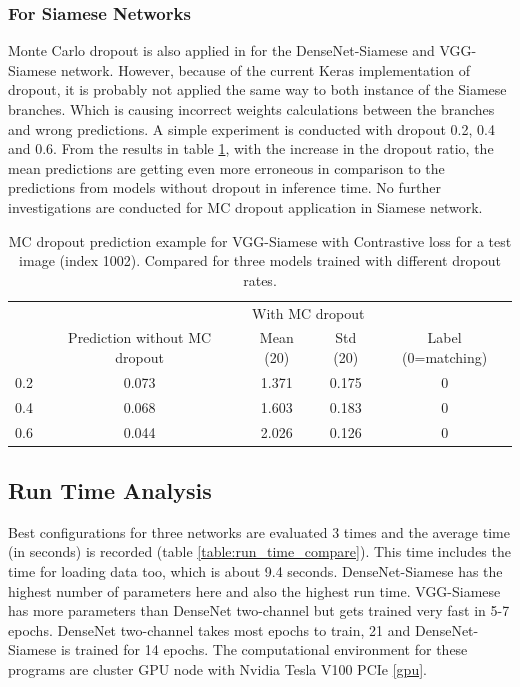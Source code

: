 \subsubsection{For Siamese Networks}
Monte Carlo dropout is also applied in for the DenseNet-Siamese and VGG-Siamese network. However, because of the current Keras implementation of dropout, it is probably not applied the same way to both instance of the Siamese branches. 
Which is causing incorrect weights calculations between the branches and wrong predictions. A simple experiment is conducted with dropout 0.2, 0.4 and 0.6. From the results in table \ref{table:VGG-Siamese_mcd}, with
the increase in the dropout ratio, the mean predictions
are getting even more erroneous in comparison to the predictions from models without dropout in inference time. No further investigations are conducted for MC dropout application in Siamese network. 

\begin{table}[ht]
\centering
\caption{MC dropout prediction example for VGG-Siamese with Contrastive loss for a test image (index 1002). Compared for three models trained with different dropout rates.}
\resizebox{\textwidth}{!}
{\begin{tabular}{|c| c| c| c |c|} 
\rowcolor{lightgrey}
 \hline\hline
  &  &  \multicolumn{2}{c|}{With MC dropout} & \\ \cline{3-4}
  \rowcolor{lightgrey}
 \multirow{-2}{2cm}{Dropout probability} & \multirow{-2}{3.4cm}{Prediction without MC dropout} &  \multicolumn{1}{c|}{Mean (20)} &  \multicolumn{1}{c|}{Std (20)}& \multirow{-2}{2.6cm}{Label (0=matching)}\\ \hline
0.2 &  0.073 &  1.371 &  0.175 &  0\\
0.4 &  0.068 &  1.603 &  0.183 &  0\\
0.6 &  0.044 &  2.026 &  0.126 &  0\\
 \hline \hline
 \end{tabular}}
\label{table:VGG-Siamese_mcd}
\end{table}

\flushbottom
\newpage


\subsection{Run Time Analysis}
Best configurations for three networks are evaluated 3 times and the average time (in seconds) is recorded (table \ref{table:run_time_compare}). This time includes the time for loading data too, which is about 9.4 seconds.
DenseNet-Siamese has the highest number of parameters here and also the highest run time. VGG-Siamese has more parameters than DenseNet two-channel but gets trained very fast in 5-7 epochs. DenseNet two-channel takes most epochs 
to train, 21 and DenseNet-Siamese is trained for 14 epochs. The computational environment for these programs are cluster GPU node with Nvidia Tesla V100 PCIe \ref{gpu}.

